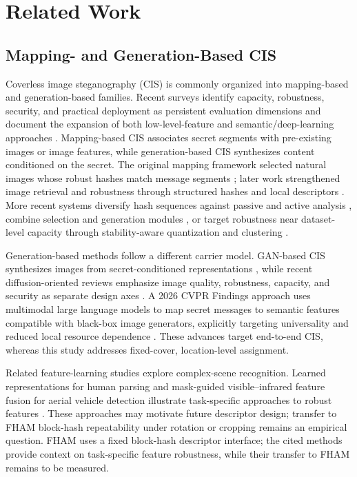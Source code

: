 \documentclass[preprint,12pt]{elsarticle}
\theoremstyle{plain}
\begin{document}
\section{Related Work}
\label{sec:related}

\subsection{Mapping- and Generation-Based CIS}
Coverless image steganography (CIS) is commonly organized into mapping-based and generation-based families. Recent surveys identify capacity, robustness, security, and practical deployment as persistent evaluation dimensions and document the expansion of both low-level-feature and semantic/deep-learning approaches \cite{tan2024review,xiang2025survey,zhang2026diffusion}. Mapping-based CIS associates secret segments with pre-existing images or image features, while generation-based CIS synthesizes content conditioned on the secret. The original mapping framework selected natural images whose robust hashes match message segments \cite{zhou2015coverless}; later work strengthened image retrieval and robustness through structured hashes and local descriptors \cite{zheng2018coverless,li2024surf}. More recent systems diversify hash sequences against passive and active analysis \cite{guo2024diverse}, combine selection and generation modules \cite{ren2024joint}, or target robustness near dataset-level capacity through stability-aware quantization and clustering \cite{guo2026capacity}.

Generation-based methods follow a different carrier model. GAN-based CIS synthesizes images from secret-conditioned representations \cite{qin2020gan}, while recent diffusion-oriented reviews emphasize image quality, robustness, capacity, and security as separate design axes \cite{zhang2026diffusion}. A 2026 CVPR Findings approach uses multimodal large language models to map secret messages to semantic features compatible with black-box image generators, explicitly targeting universality and reduced local resource dependence \cite{li2026mllm}. These advances target end-to-end CIS, whereas this study addresses fixed-cover, location-level assignment.

Related feature-learning studies explore complex-scene recognition. Learned
representations for human parsing and mask-guided visible--infrared feature
fusion for aerial vehicle detection illustrate task-specific approaches to
robust features \cite{liu2024humanparsing,wang2024maskmamba}. These approaches
may motivate future descriptor design; transfer to FHAM block-hash
repeatability under rotation or cropping remains an empirical question. FHAM
uses a fixed block-hash descriptor interface; the cited methods provide
context on task-specific feature robustness, while their transfer to FHAM
remains to be measured.
\end{document}
